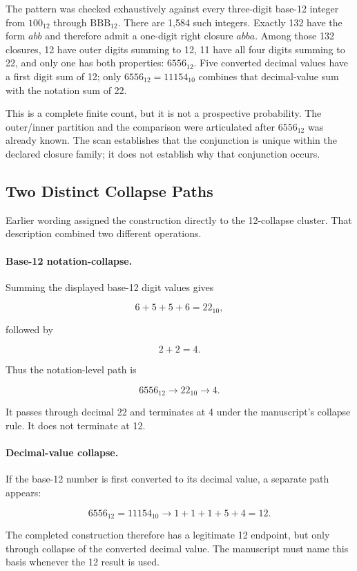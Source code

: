 The pattern was checked exhaustively against every three-digit base-12 integer from $100_{12}$ through $\mathrm{BBB}_{12}$. There are 1,584 such integers. Exactly 132 have the form $abb$ and therefore admit a one-digit right closure $abba$. Among those 132 closures, 12 have outer digits summing to 12, 11 have all four digits summing to 22, and only one has both properties: $6556_{12}$. Five converted decimal values have a first digit sum of 12; only $6556_{12}=11154_{10}$ combines that decimal-value sum with the notation sum of 22.

This is a complete finite count, but it is not a prospective probability. The outer/inner partition and the comparison were articulated after $6556_{12}$ was already known. The scan establishes that the conjunction is unique within the declared closure family; it does not establish why that conjunction occurs.

\subsection{Two Distinct Collapse Paths}

Earlier wording assigned the construction directly to the 12-collapse cluster. That description combined two different operations.

\paragraph{Base-12 notation-collapse.}
Summing the displayed base-12 digit values gives

\[
6+5+5+6=22_{10},
\]

followed by

\[
2+2=4.
\]

Thus the notation-level path is

\[
6556_{12}\longrightarrow22_{10}\longrightarrow4.
\]

It passes through decimal 22 and terminates at 4 under the manuscript's collapse rule. It does not terminate at 12.

\paragraph{Decimal-value collapse.}
If the base-12 number is first converted to its decimal value, a separate path appears:

\[
6556_{12}=11154_{10}
\longrightarrow1+1+1+5+4=12.
\]

The completed construction therefore has a legitimate 12 endpoint, but only through collapse of the converted decimal value. The manuscript must name this basis whenever the 12 result is used.

